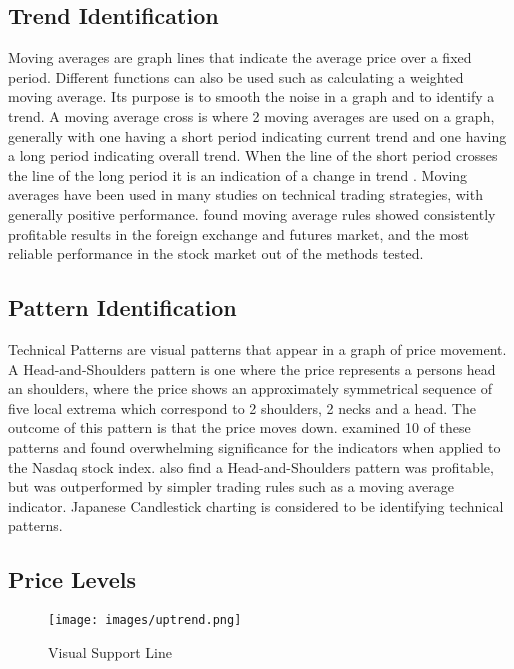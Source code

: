 \documentclass[12pt]{article}
\theoremstyle{definition}
\begin{document}
\subsection{Trend Identification}
Moving averages are graph lines that indicate the average price over a fixed period. Different functions can also be used such as calculating a weighted moving average. Its purpose is to smooth the noise in a graph and to identify a trend. A moving average cross is where 2 moving averages are used on a graph, generally with one having a short period indicating current trend and one having a long period indicating overall trend. When the line of the short period crosses the line of the long period it is an indication of a change in trend \citep{brock1992}. Moving averages have been used in many studies on technical trading strategies, with generally positive performance. \cite{taprofitability} found moving average rules showed consistently profitable results in the foreign exchange and futures market, and the most reliable performance in the stock market out of the methods tested.

\subsection{Pattern Identification}
Technical Patterns are visual patterns that appear in a graph of price movement. A Head-and-Shoulders pattern is one where the price represents a persons head an shoulders, where the price shows an approximately symmetrical sequence of five local extrema which correspond to 2 shoulders, 2 necks and a head. The outcome of this pattern is that the price moves down. \cite{foundations} examined 10 of these patterns and found overwhelming significance for the indicators when applied to the Nasdaq stock index. \cite{chang1999methodical} also find a Head-and-Shoulders pattern was profitable, but was outperformed by simpler trading rules such as a moving average indicator. Japanese Candlestick charting is considered to be identifying technical patterns.

\subsection{Price Levels}

\begin{figure}[H]
    \centering
    \texttt{[image: images/uptrend.png]}
    \caption{Visual Support Line}
\end{figure}
\end{document}
